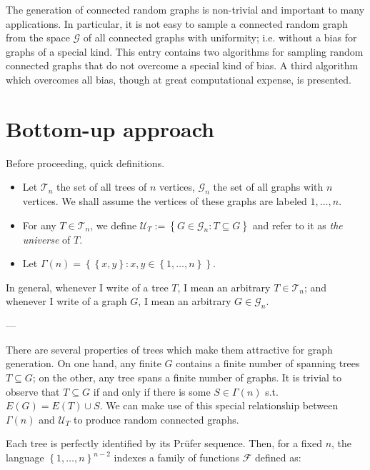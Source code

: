 \documentclass[a4paper, 12pt]{article}
\begin{document}
The generation of connected random graphs is non-trivial and important to many
applications. In particular, it is not easy to sample a connected random graph
from the space $\mathcal{G}$ of all connected graphs with uniformity; i.e.
without a bias for graphs of a special kind. This entry contains two algorithms
for sampling random connected graphs that do not overcome a special kind of
bias. A third algorithm which overcomes all bias, though at great computational
expense, is presented.

\section{Bottom-up approach}

Before proceeding, quick definitions.

\begin{itemize}
    \item Let $\mathcal{T}_n$ the set of all trees of $n$ vertices,
        $\mathcal{G}_n$ the set of all graphs with $n$ vertices. We shall
        assume the vertices of these graphs are labeled $1, \ldots, n$. 
    \item For any $T \in \mathcal{T}_n$, we define $\mathcal{U}_T := \left\{ G
        \in \mathcal{G}_n : T \subseteq G  \right\} $ and refer to it as
        \textit{the universe} of $T$.
    \item Let $\Gamma(n) = \left\{ \left\{ x, y \right\} : x, y \in \left\{ 1, \ldots, n\right\}    \right\} $. 
\end{itemize}

In general, whenever I write of a tree $T$, I mean an arbitrary $T \in \mathcal{T}_n$;
and whenever I write of a graph $G$, I mean an arbitrary $G \in \mathcal{G}_n$.

---

There are several properties of trees which make them attractive for graph
generation. On one hand, any finite $G$ contains a finite number of spanning
trees $T \subseteq G$; on the other, any tree spans a finite number of graphs.
It is trivial to observe that $T \subseteq G$ if and only if there is some $S
\in \Gamma(n)$ s.t. $E(G) = E(T) \cup S$. We can make use of this special
relationship between $\Gamma(n)$ and $\mathcal{U}_T$ to produce random
connected graphs.

Each tree is perfectly identified by its Prüfer sequence. Then, for a fixed
$n$, the language $\left\{ 1, \ldots, n \right\}^{n-2} $ indexes a family of
functions $\mathcal{F}$ defined as:
\end{document}
